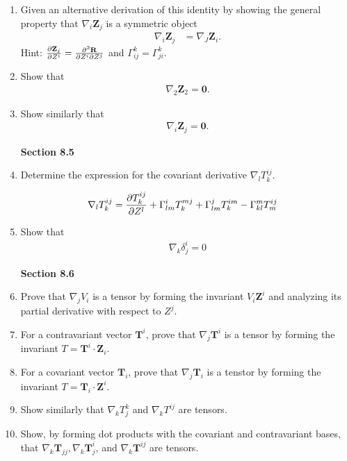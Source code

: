 \documentclass[12pt,a4paper]{report}
\newcommand{\BLUE}[1]{\textcolor{blue}{#1}}
\newcommand{\COFF}[3]{\Gamma^{#1}_{{#2}{#3}}}
\newcommand{\VK}[1]{\textbf{#1}}
\begin{document}
\begin{enumerate}[label=\textbf{\arabic*.}]
\item Given an alternative derivation of this identity by showing the general property that $\nabla_i \VK{Z}_j$ is a symmetric object
\begin{align*}
	\nabla_i\VK{Z}_j &= \nabla_J\VK{Z}_i.
\end{align*}Hint: $\PART{\VK{Z}_j}{Z^i} = \frac{\partial^2 \VK{R}}{\partial Z^i\partial Z^j}$ and $\COFF{k}{i}{j}=\COFF{k}{j}{i}$.

\item Show that 
\begin{align*}
	\nabla_2\VK{Z}_2 = \VK{0}.
\end{align*}

\item Show similarly that 
\begin{align*}
	\nabla_i\VK{Z}_j = \VK{0}.
\end{align*}

\textbf{Section 8.5}
\item Determine the expression for the covariant derivative $\nabla_lT^{ij}_k$.

\BLUE{\begin{align*}
	\nabla_l T^{ij}_k &= \PART{T^{ij}_k}{Z^l}+ \COFF{i}{l}{m}T^{mj}_k + \COFF{j}{l}{m}T^{im}_k - \COFF{m}{k}{l}T^{ij}_m
\end{align*}
}

\item Show that 
\begin{align*}
	\nabla_k\delta^i_j = 0
\end{align*}

\textbf{Section 8.6}
\item Prove that $\nabla _jV_i$ is a tensor by forming the invariant $V_i\VK{Z}^i$ and analyzing its partial derivative with respect to $Z^j$.

\item For a contravariant vector $\VK{T}^i$, prove that $\nabla_j\VK{T}^i$ is a tensor by forming the invariant $T = \VK{T}^i\cdot\VK{Z}_i$.

\item For a covariant vector $\VK{T}_i$, prove that $\nabla_j\VK{T}_i$ is a tenstor by forming the invariant $T = \VK{T}_i\cdot \VK{Z}^i$.

\item Show similarly that $\nabla_kT^k_j$ and $\nabla_kT^{ij}$ are tensors.

\item Show, by forming dot products with the covariant and contravariant bases, that $\nabla_k\VK{T}_{jj}, \nabla_k\VK{T}^i_j$, and $\nabla_k\VK{T}^{ij}$ are tensors.


\end{enumerate}
\end{document}
